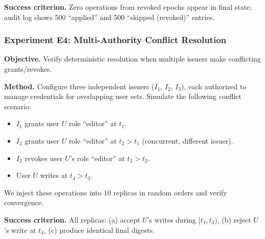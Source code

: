 \textbf{Success criterion.} Zero operations from revoked epochs appear in final state; audit log shows 500 ``applied'' and 500 ``skipped (revoked)'' entries.



\subsubsection{Experiment E4: Multi-Authority Conflict Resolution}
\textbf{Objective.} Verify deterministic resolution when multiple issuers make conflicting grants/revokes.

\textbf{Method.} Configure three independent issuers ($I_1$, $I_2$, $I_3$), each authorized to manage credentials for overlapping user sets. Simulate the following conflict scenario:
\begin{itemize}
    \item $I_1$ grants user $U$ role ``editor'' at $t_1$.
    \item $I_2$ grants user $U$ role ``editor'' at $t_2 > t_1$ (concurrent, different issuer).
    \item $I_3$ revokes user $U$'s role ``editor'' at $t_3 > t_2$.
    \item User $U$ writes at $t_4 > t_3$.
\end{itemize}
We inject these operations into 10 replicas in random orders and verify convergence.

\textbf{Success criterion.} All replicas: (a) accept $U$'s writes during $[t_1, t_3)$, (b) reject $U$'s write at $t_4$, (c) produce identical final digests.

